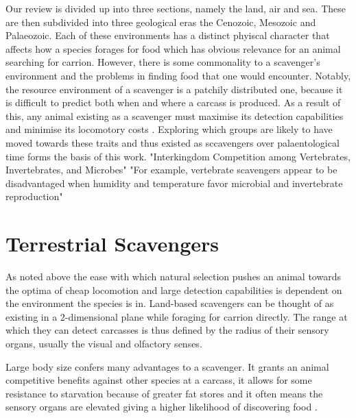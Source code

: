 \documentclass[a4paper,12pt]{article}
\begin{document}
Our review is divided up into three sections, namely the land, air and sea. 
These are then subdivided into three geological eras the Cenozoic, Mesozoic and Palaeozoic. 
Each of these environments has a distinct phyiscal character that affects how a species forages for food which has obvious relevance for an animal searching for carrion.  
However, there is some commonality to a scavenger's environment and the problems in finding food that one would encounter. 
Notably, the resource environment of a scavenger is a patchily distributed one, because it is difficult to predict both when and where a carcass is produced. 
As a result of this, any animal existing as a scavenger must maximise its detection capabilities and minimise its locomotory costs \citep{ruxton2004obligate}.
Exploring which groups are likely to have moved towards these traits and thus existed as sccavengers over palaentological time forms the basis of this work.
"Interkingdom Competition among Vertebrates, Invertebrates, and Microbes"\citep{benbow2015introduction}
"For example, vertebrate scavengers appear to be disadvantaged when humidity and temperature favor microbial and invertebrate reproduction" \citep{benbow2015introduction}

\section{Terrestrial Scavengers}
As noted above the ease with which natural selection pushes an animal towards the optima of cheap locomotion and large detection capabilities is dependent on the environment the species is in. 
Land-based scavengers can be thought of as existing in a 2-dimensional plane while foraging for carrion directly. 
The range at which they can detect carcasses is thus defined by the radius of their sensory organs, usually the visual and olfactory senses. 

Large body size confers many advantages to a scavenger. 
It grants an animal competitive benefits against other species at a carcass, it allows for some resistance to starvation because of greater fat stores and it often means the sensory organs are elevated giving a higher likelihood of discovering food \citep{farlow1994speculations}.
\end{document}

